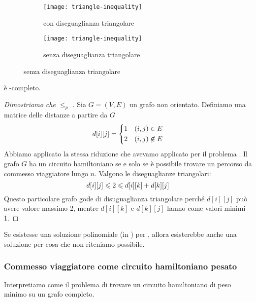 \begin{figure}[H]
	\begin{subfigure}[t]{.5\linewidth}\centering
		\texttt{[image: triangle-inequality]}
		\caption{con diseguaglianza triangolare}
	\end{subfigure}%
	\begin{subfigure}[t]{.5\linewidth}\centering
		\texttt{[image: triangle-inequality]}
		\caption{senza diseguaglianza triangolare}
	\end{subfigure}
\end{figure}

\begin{note}
{\deltaTsp} è \NP-completo.
\end{note}

\begin{proof}[Dimostriamo che {\hamiltonianCircuit} \(\leqslant_p\) \texorpdfstring{{\deltaTsp}}{}]
Sia \(G = (V, E)\) un grafo non orientato. Definiamo una matrice delle distanze a partire da \(G\)
\[
	d[i][j] =
	\begin{dcases}
		1 & (i,j) \in E\\
		2 & (i,j) \not\in E\\
	\end{dcases}
\]
Abbiamo applicato la stessa riduzione che avevamo applicato per il problema {\tsp}.
Il grafo \(G\) ha un circuito hamiltoniano se e solo se è possibile trovare un percorso da commesso viaggiatore lungo \(n\).
Valgono le diseguaglianze triangolari:
\[
	d[i][j] \leqslant 2 \leqslant d[i][k] + d[k][j]\qedhere
\]
Questo particolare grafo gode di disuguaglianza triangolare perché \(d[i][j]\) può avere valore massimo 2, mentre \(d[i][k]\) e \(d[k][j]\) hanno come valori minimi 1.
\end{proof}

\begin{note}
Se esistesse una soluzione polinomiale (in {\PTIME}) per {\deltaTsp}, allora esisterebbe anche una soluzione per {\hamiltonianCircuit} cosa che non riteniamo possibile.
\end{note}

\subsubsection{Commesso viaggiatore come circuito hamiltoniano pesato}

Interpretiamo {\deltaTsp} come il problema di trovare un circuito hamiltoniano di peso minimo su un grafo completo.

